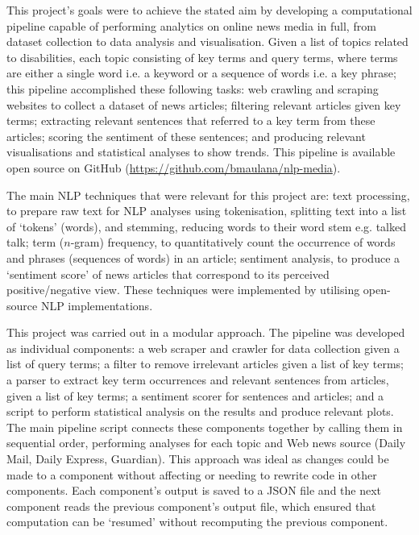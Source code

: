 \documentclass{report}
\begin{document}
This project's goals were to achieve the stated aim by developing a computational pipeline capable of performing analytics on online news media in full, from dataset collection to data analysis and visualisation.
Given a list of topics related to disabilities, each topic consisting of key terms and query terms, where terms are either a single word i.e. a keyword or a sequence of words i.e. a key phrase;
this pipeline accomplished these following tasks: 
web crawling and scraping websites to collect a dataset of news articles;
filtering relevant articles given key terms; 
extracting relevant sentences that referred to a key term from these articles;
scoring the sentiment of these sentences;
and producing relevant visualisations and statistical analyses to show trends.
This pipeline is available open source on GitHub (\url{https://github.com/bmaulana/nlp-media}).

The main NLP techniques that were relevant for this project are:
text processing, to prepare raw text for NLP analyses using tokenisation, splitting text into a list of `tokens' (words), and stemming, reducing words to their word stem e.g. talked \textrightarrow\space talk;
term ($n$-gram) frequency, to quantitatively count the occurrence of words and phrases (sequences of words) in an article;
sentiment analysis, to produce a `sentiment score' of news articles that correspond to its perceived positive/negative view.
These techniques were implemented by utilising open-source NLP implementations.

This project was carried out in a modular approach. The pipeline was developed as individual components: 
a web scraper and crawler for data collection given a list of query terms; 
a filter to remove irrelevant articles given a list of key terms; 
a parser to extract key term occurrences and relevant sentences from articles, given a list of key terms; 
a sentiment scorer for sentences and articles; 
and a script to perform statistical analysis on the results and produce relevant plots. 
The main pipeline script connects these components together by calling them in sequential order, performing analyses for each topic and Web news source (Daily Mail, Daily Express, Guardian).
This approach was ideal as changes could be made to a component without affecting or needing to rewrite code in other components.
Each component's output is saved to a JSON \cite{rfc8259} file and the next component reads the previous component's output file, which ensured that computation can be `resumed' without recomputing the previous component. %
\end{document}
